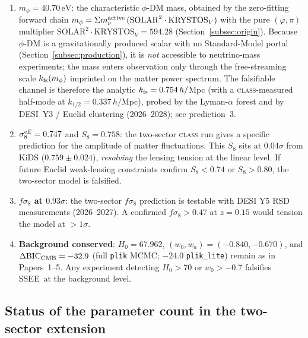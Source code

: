 \documentclass[12pt,a4paper]{article}
\newcommand{\SSEE}{\textsc{SSEE}}
\newcommand{\phiDM}{\phi\text{-DM}}
\newcommand{\kfs}{k_{\rm fs}}
\newcommand{\mphi}{m_\phi}
\newcommand{\mnu}{\Sigma m_\nu}
\newcommand{\fsig}{f\sigma_8}
\newcommand{\sigeff}{\sigma_8^{\rm eff}}
\begin{document}
\begin{tcolorbox}[falsifiable, title={Falsifiable predictions — Paper 6}]
  \begin{enumerate}
    \item \textbf{$m_\phi = 40.70\,\mathrm{eV}$}: the characteristic $\phi$-DM
      mass, obtained by the zero-fitting forward chain
      $\mphi = \mnu^{\rm active}\,(\mathrm{SOLAR}^2\cdot\mathrm{KRYSTOS}_V)$ with the
      pure $(\varphi,\pi)$ multiplier $\mathrm{SOLAR}^2\cdot\mathrm{KRYSTOS}_V = 594.28$
      (Section~\ref{subsec:origin}).  Because $\phiDM$ is a gravitationally
      produced scalar with no Standard-Model portal
      (Section~\ref{subsec:production}), it is \emph{not} accessible to
      neutrino-mass experiments; the mass enters observation only through the
      free-streaming scale $\kfs(\mphi)$ imprinted on the matter power
      spectrum.  The falsifiable channel is therefore the analytic
      $\kfs = 0.754\,h/$Mpc (with a \textsc{class}-measured half-mode at
      $k_{1/2} = 0.337\,h/$Mpc), probed by the Lyman-$\alpha$ forest and by
      DESI~Y3 / Euclid clustering (2026--2028); see prediction~3.
    \item \textbf{$\sigeff = 0.747$} and $S_8 = 0.758$: the two-sector \textsc{class}
      run gives a specific prediction for the amplitude of matter fluctuations.
      This $S_8$ sits at $0.04\sigma$ from KiDS ($0.759 \pm 0.024$), \emph{resolving}
      the lensing tension at the linear level. If future Euclid weak-lensing
      constraints confirm $S_8 < 0.74$ or $S_8 > 0.80$, the two-sector model is
      falsified.
    \item \textbf{$\fsig$ at $0.93\sigma$}: the two-sector $\fsig$ prediction is
      testable with DESI Y5 RSD measurements (2026--2027). A confirmed
      $f\sigma_8 > 0.47$ at $z = 0.15$ would tension the model at $> 1\sigma$.
    \item \textbf{Background conserved}: $H_0 = 67.962$, $(w_0, w_a) = (-0.840, -0.670)$,
      and $\Delta\mathrm{BIC}_{\rm CMB} = -32.9$ (full \texttt{plik} MCMC; $-24.0$
      \texttt{plik\_lite}) remain as in Papers~1--5.
      Any experiment detecting $H_0 > 70$ or $w_0 > -0.7$ falsifies \SSEE\ at
      the background level.
  \end{enumerate}
\end{tcolorbox}

\subsection{Status of the parameter count in the two-sector extension}
\label{subsec:zero_params}
\end{document}
